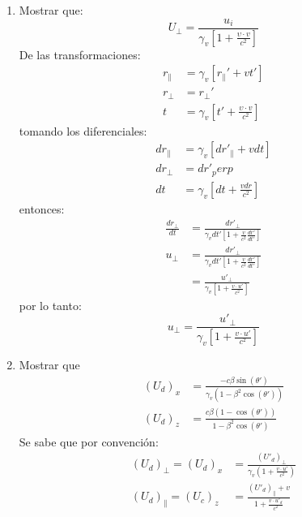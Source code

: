 \documentclass[12pt,letterpaper]{report}
\begin{document}
\begin{enumerate}
    \item Mostrar que:
    \begin{equation*}
        U_\perp=\frac{u_i}{\gamma_v \left[1+\frac{\upsilon \cdot v}{c^2} \right]}
    \end{equation*}
    De las transformaciones:
    \begin{align*}
        r_\parallel &= \gamma_v [{r_\parallel}'+v{t}']\\
        r_\perp &= {r_\perp}'\\
        t&= \gamma_v \left[ {t}'+\frac{\upsilon \cdot v}{c^2}\right]
    \end{align*}
    tomando los diferenciales:
    \begin{align*}
        dr_\parallel &= \gamma_v \left[{dr}'_\parallel + vdt\right]\\
        dr_\perp &= {dr}'_perp\\
        dt&=\gamma_v \left[dt+ \frac{vdr}{c^2} \right]
    \end{align*}
    entonces:
    \begin{align*}
        \frac{dr_\perp}{dt}&= \frac{{dr}'_\perp}{\gamma_v {dt}'\left[1+\frac{v}{c^2} \frac{{dr}'}{{dt}'} \right]}\\
        u_\perp&= \frac{{dr}'_\perp}{\gamma_v {dt}' \left[1+\frac{v}{c^2}\frac{{dr}'}{{dt}'} \right]}\\
        & = \frac{{u}'_\perp}{\gamma_v \left[1+\frac{v\cdot {u}'}{c^2} \right]}
    \end{align*}
    por lo tanto:
    \begin{equation}
        u_\perp = \frac{{u}'_\perp}{\gamma_v \left[1+\frac{v\cdot {u}'}{c^2} \right]}
    \end{equation}
    \item Mostrar que
    \begin{align*}
        (U_d)_x &= \frac{-c\beta \sin({\theta}')}{\gamma_v (1-\beta^2 \cos({\theta}'))}\\
        (U_d)_z &= \frac{c\beta (1-\cos({\theta}'))}{1-\beta^2 \cos({\theta}')}
    \end{align*}
    Se sabe que por convención:
    \begin{align*}
        (U_d)_\perp = (U_d)_x &= \frac{({U}'_d)_\perp}{\gamma_v \left(1+\frac{v \cdot {u}'}{c^2} \right)}\\
        (U_d)_\parallel = (U_c)_z &= \frac{({U}'_d)_\parallel+v}{1+\frac{v \cdot {u}'_d}{c^2}}\\
    \end{align*}

\end{enumerate}
\end{document}

